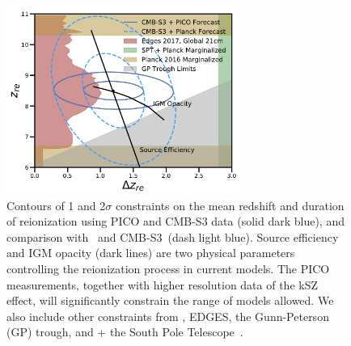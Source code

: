 \documentclass[PICOReport.tex]{subfiles}
\begin{document}
\begin{figure}
\hspace{-0.2in}
\parbox{3.1in}{\centerline {
\includegraphics[width=3.0in]{images/Reionization_Contours_zbar_delz_PICO_NEW.pdf} } }
\hspace{0.in}
\parbox{3.5in}{
\caption{\captiontext 
Contours of 1 and 2$\sigma$ constraints on the mean redshift and duration of reionization using PICO and CMB-S3 data (solid dark blue), and comparison with \planck\ and CMB-S3~(dash light blue). Source efficiency and IGM opacity (dark lines) are two physical parameters controlling the reionization process in current models. The PICO measurements, together with higher resolution data of the kSZ effect, will significantly constrain the range of models allowed. We also include other constraints from \planck , EDGES, the Gunn-Peterson (GP) trough, and \planck + the South Pole Telescope~\citep{Planck2018_VI,EDGES2017,Fan2006,Planck2016_reion}.  
\label{fig:ReionizationPICO}
} }
\vspace{-0.1in}
\end{figure}

\end{document}
